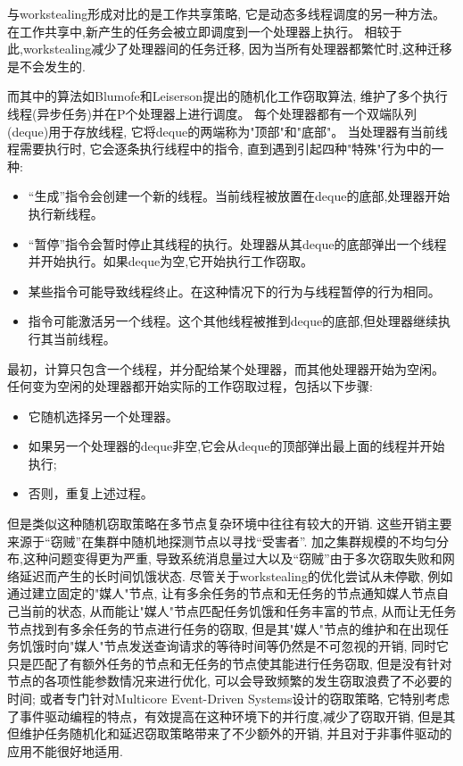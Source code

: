\documentclass{mproj}
\begin{document}
与workstealing形成对比的是工作共享策略,
它是动态多线程调度的另一种方法。
在工作共享中,新产生的任务会被立即调度到一个处理器上执行。
相较于此,workstealing减少了处理器间的任务迁移,
因为当所有处理器都繁忙时,这种迁移是不会发生的.\cite{10.1145/324133.324234}

而其中的算法如Blumofe和Leiserson提出的随机化工作窃取算法,
维护了多个执行线程(异步任务)并在P个处理器上进行调度\cite{10.1145/324133.324234}。
每个处理器都有一个双端队列(deque)用于存放线程,
它将deque的两端称为"顶部"和"底部"。
当处理器有当前线程需要执行时,
它会逐条执行线程中的指令,
直到遇到引起四种"特殊"行为中的一种:
\begin{itemize}
    \item “生成”指令会创建一个新的线程。当前线程被放置在deque的底部,处理器开始执行新线程。
    \item “暂停”指令会暂时停止其线程的执行。处理器从其deque的底部弹出一个线程并开始执行。如果deque为空,它开始执行工作窃取。
    \item 某些指令可能导致线程终止。在这种情况下的行为与线程暂停的行为相同。
    \item 指令可能激活另一个线程。这个其他线程被推到deque的底部,但处理器继续执行其当前线程。
\end{itemize}
最初，计算只包含一个线程，并分配给某个处理器，而其他处理器开始为空闲。
任何变为空闲的处理器都开始实际的工作窃取过程，包括以下步骤:
\begin{itemize}
    \item 它随机选择另一个处理器。
    \item 如果另一个处理器的deque非空,它会从deque的顶部弹出最上面的线程并开始执行;
    \item 否则，重复上述过程。
\end{itemize}

但是类似这种随机窃取策略在多节点复杂环境中往往有较大的开销.
这些开销主要来源于“窃贼”在集群中随机地探测节点以寻找“受害者”.
加之集群规模的不均匀分布,这种问题变得更为严重,
导致系统消息量过大以及“窃贼”由于多次窃取失败和网络延迟而产生的长时间饥饿状态.
尽管关于workstealing的优化尝试从未停歇,
例如通过建立固定的"媒人"节点,
让有多余任务的节点和无任务的节点通知媒人节点自己当前的状态,
从而能让"媒人"节点匹配任务饥饿和任务丰富的节点,
从而让无任务节点找到有多余任务的节点进行任务的窃取\cite{10.1145/2851141.2851175},
但是其"媒人"节点的维护和在出现任务饥饿时向"媒人"节点发送查询请求的等待时间等仍然是不可忽视的开销,
同时它只是匹配了有额外任务的节点和无任务的节点使其能进行任务窃取,
但是没有针对节点的各项性能参数情况来进行优化,
可以会导致频繁的发生窃取浪费了不必要的时间;
或者专门针对Multicore Event-Driven Systems设计的窃取策略\cite{5541655},
它特别考虑了事件驱动编程的特点，有效提高在这种环境下的并行度,减少了窃取开销,
但是其但维护任务随机化和延迟窃取策略带来了不少额外的开销,
并且对于非事件驱动的应用不能很好地适用.
\end{document}
